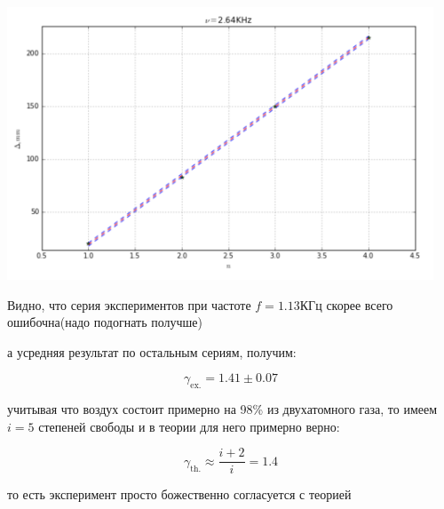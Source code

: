 \documentclass[12pt]{article}
\begin{document}
\begin{enumerate}
\begin{itemize}
        \begin{center} 
            \includegraphics[width=5in]{2ex.png}
        \end{center}

    \end{itemize}

    \end{enumerate}

    Видно, что серия экспериментов при частоте $f = 1.13\text{КГц}$ скорее всего ошибочна(надо подогнать получше)

    а усредняя результат по остальным сериям, получим:

    \begin{equation}
        \gamma_\text{ex.} = 1.41 \pm 0.07 
    \end{equation}

    учитывая что воздух состоит примерно на 98\% из двухатомного газа, то имеем $i = 5$ степеней свободы и в теории для него примерно верно:

    \begin{equation}
        \gamma_\text{th.} \approx \frac{i+2}{i} = 1.4
    \end{equation}

    то есть эксперимент просто божественно согласуется с теорией
\end{document}
